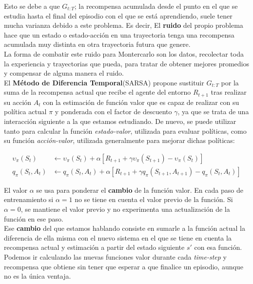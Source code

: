 \documentclass[11pt,fleqn]{book} %
\begin{document}
Esto se debe a que $G_{t:T}$; la recompensa acumulada desde el punto en el que se estudia hasta el final del episodio con el que se está aprendiendo, suele tener mucha varianza debido a este problema. Es decir, El \textbf{ruido} del propio problema hace que un estado o estado-acción en una trayectoria tenga una recompensa acumulada muy distinta en otra trayectoria futura que genere. \\

La forma de combatir este ruido para Montercarlo son los datos, recolectar toda la experiencia y trayectorias que pueda, para tratar de obtener mejores promedios y compensar de alguna manera el ruido. \\

El \textbf{Método de Diferencia Temporal}(SARSA) propone sustituir $G_{t:T}$ por la suma de la recompensa actual que recibe el agente del entorno $R_{t+1}$ tras realizar su acción $A_t$ con la estimación de función valor que es capaz de realizar con su política actual $\pi$ y ponderada con el factor de descuento $\gamma$, ya que se trata de una interacción siguiente a la que estamos estudiando. De nuevo, se puede utilizar tanto para calcular la función \textit{estado-valor}, utilizada para evaluar políticas, como su función \textit{acción-valor}, utilizada generalmente para mejorar dichas políticas:

\begin{align*}
\upsilon_\pi(S_t) &\leftarrow \upsilon_\pi(S_t)+\alpha\left[R_{t+1}+\gamma \upsilon_\pi(S_{t+1}) - \upsilon_\pi(S_t)\right] \\
q_\pi(S_t,A_t) &\leftarrow q_\pi(S_t,A_t)+\alpha\left[R_{t+1}+\gamma q_\pi(S_{t+1},A_{t+1}) - q_\pi(S_t,A_t)\right]
\end{align*}

El valor $\alpha$ se usa para ponderar el \textbf{cambio} de la función valor. En cada paso de entrenamiento si $\alpha=1$ no se tiene en cuenta el valor previo de la función. Si $\alpha=0$, se mantiene el valor previo y no experimenta una actualización de la función en ese paso.\\

Ese \textbf{cambio} del que estamos hablando consiste en sumarle a la función actual la diferencia de ella misma con el nuevo sistema en el que se tiene en cuenta la recompensa actual y estimación a partir del estado siguiente $s'$ con esa función.\\

Podemos ir calculando las nuevas funciones valor durante cada \textit{time-step} y recompensa que obtiene sin tener que esperar a que finalice un episodio, aunque no es la única ventaja. \\
\end{document}
